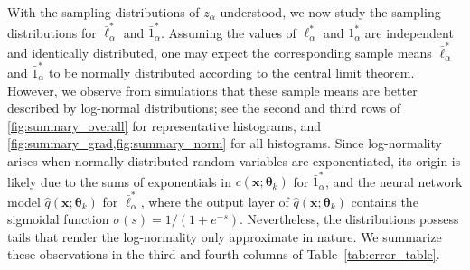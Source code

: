 \documentclass{article}
\numberwithin{equation}{section}
\def\*#1{\mathbf{#1}}
\theoremstyle{definition}
\theoremstyle{remark}
\def\thetab{\boldsymbol{\theta}}
\begin{document}
With the sampling distributions of $z_\alpha$ understood, we now study the sampling distributions for $ \bar{\ell}_{\alpha}^{*} $ and $ \bar{1}_{\alpha}^{*} $. 
Assuming the values of $ \ell_{\alpha}^{*} $ and $ 1_{\alpha}^{*} $ are independent and identically distributed, one may expect the corresponding sample means $ \bar{\ell}_{\alpha}^{*} $ and $ \bar{1}_{\alpha}^{*} $ to be normally distributed according to the central limit theorem. 
However, we observe from simulations that these sample means are better described by log-normal distributions; see the second and third rows of \cref{fig:summary_overall} for representative histograms, and \cref{fig:summary_grad,fig:summary_norm} for all histograms. Since log-normality arises when normally-distributed random variables are exponentiated, its origin is likely due to the sums of exponentials in $c(\* x;\thetab_k)$ for $\bar{1}_{\alpha}^{*}$, and the neural network model $\hat{q}(\* x; \thetab_k)$ for $ \bar{\ell}_{\alpha}^{*} $, where the output layer of $\hat{q}(\* x; \thetab_k)$ contains the sigmoidal function $\sigma(s) = 1/(1+e^{-s})$. 
Nevertheless, the distributions possess tails that render the log-normality only approximate in nature. 
We summarize these observations in the third and fourth columns of Table~\ref{tab:error_table}. 
\end{document}
